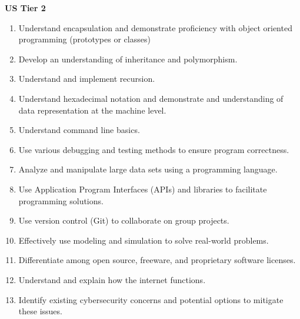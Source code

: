 \textbf{US Tier 2}
\begin{enumerate}
	\item Understand encapsulation and demonstrate proficiency with object oriented programming (prototypes or classes)
	\item Develop an understanding of inheritance and polymorphism.
	\item Understand and implement recursion.
	\item Understand hexadecimal notation and demonstrate and understanding of data representation at the machine level.
	\item Understand command line basics.
	\item Use various debugging and testing methods to ensure program correctness.
	\item Analyze and manipulate large data sets using a programming language.
	\item Use Application Program Interfaces (APIs) and libraries to facilitate programming solutions.
	\item Use version control (Git) to collaborate on group projects.
	\item Effectively use modeling and simulation to solve real-world problems.
	\item Differentiate among open source, freeware, and proprietary software licenses.
	\item Understand and explain how the internet functions.
	\item Identify existing cybersecurity concerns and potential options to mitigate these issues.
\end{enumerate}


